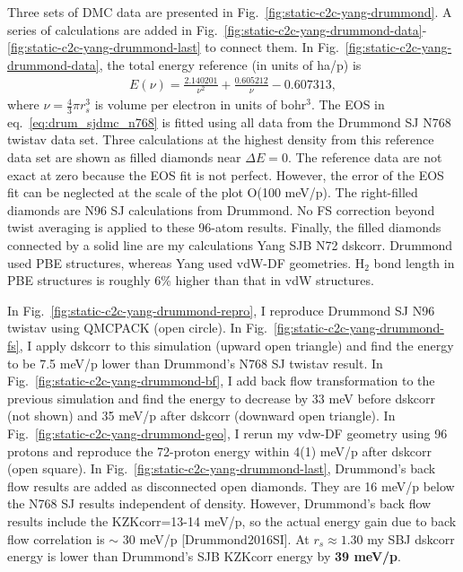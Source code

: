 Three sets of DMC data are presented in Fig.~\ref{fig:static-c2c-yang-drummond}. A series of calculations are added in Fig.~\ref{fig:static-c2c-yang-drummond-data}-\ref{fig:static-c2c-yang-drummond-last} to connect them. In Fig.~\ref{fig:static-c2c-yang-drummond-data}, the total energy reference (in units of ha/p) is
\begin{align}
E(\nu) = \frac{2.140201}{\nu^2} + \frac{0.605212}{\nu} - 0.607313, \label{eq:drum_sjdmc_n768}
\end{align}
where $\nu=\frac{4}{3}\pi r_s^3$ is volume per electron in units of bohr$^3$. The EOS in eq.~\ref{eq:drum_sjdmc_n768} is fitted using all data from the Drummond SJ N768 twistav data set. Three calculations at the highest density from this reference data set are shown as filled diamonds near $\Delta E=0$. The reference data are not exact at zero because the EOS fit is not perfect. However, the error of the EOS fit can be neglected at the scale of the plot O(100 meV/p). The right-filled diamonds are N96 SJ calculations from Drummond. No FS correction beyond twist averaging is applied to these 96-atom results. Finally, the filled diamonds connected by a solid line are my calculations Yang SJB N72 dskcorr. Drummond used PBE structures, whereas Yang used vdW-DF geometries. H$_2$ bond length in PBE structures is roughly 6\% higher than that in vdW structures.

In Fig.~\ref{fig:static-c2c-yang-drummond-repro}, I reproduce Drummond SJ N96 twistav using QMCPACK (open circle). In Fig.~\ref{fig:static-c2c-yang-drummond-fs}, I apply dskcorr to this simulation (upward open triangle) and find the energy to be 7.5 meV/p lower than Drummond's N768 SJ twistav result. In Fig.~\ref{fig:static-c2c-yang-drummond-bf}, I add back flow transformation to the previous simulation and find the energy to decrease by 33 meV before dskcorr (not shown) and 35 meV/p after dskcorr (downward open triangle). In Fig.~\ref{fig:static-c2c-yang-drummond-geo}, I rerun my vdw-DF geometry using 96 protons and reproduce the 72-proton energy within 4(1) meV/p after dskcorr (open square). In Fig.~\ref{fig:static-c2c-yang-drummond-last}, Drummond's back flow results are added as disconnected open diamonds. They are 16 meV/p below the N768 SJ results independent of density. However, Drummond's back flow results include the KZKcorr=13-14 meV/p, so the actual energy gain due to back flow correlation is $\sim$ 30 meV/p [Drummond2016SI]. At $r_s\approx1.30$ my SBJ dskcorr energy is lower than Drummond's SJB KZKcorr energy by \textbf{39 meV/p}.


